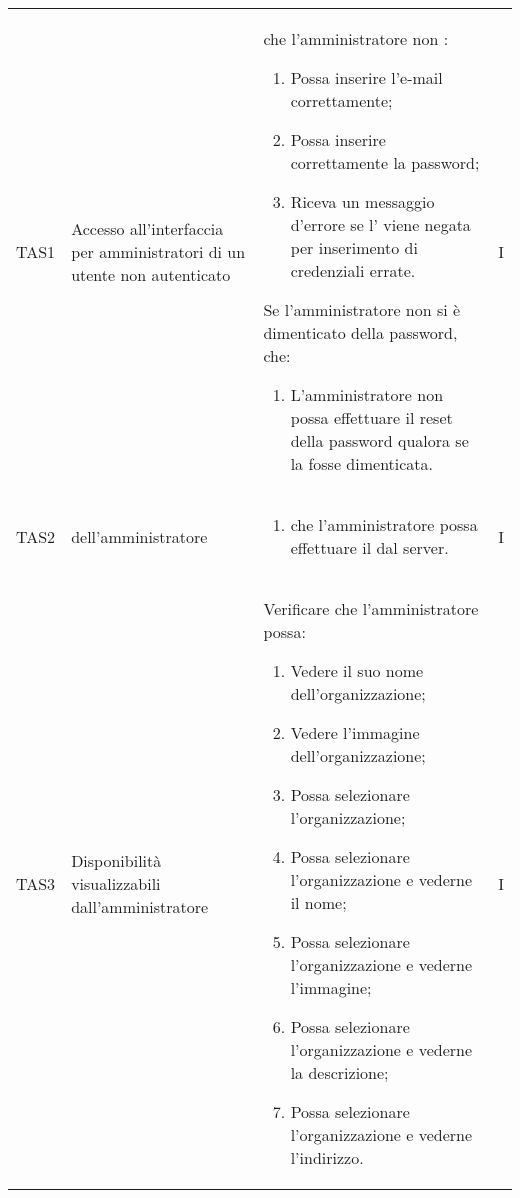 {\begin{longtable}{ c  C{2.5cm}  C{10cm} C{1cm}}
TAS1 & Accesso all'interfaccia per amministratori di un utente non autenticato & 
 che l'amministratore non :
\begin{enumerate}
    \item Possa inserire l'e-mail correttamente;
    \item Possa inserire correttamente la password;
    \item Riceva un messaggio d'errore se l' viene negata per inserimento di credenziali errate.
\end{enumerate}
Se l'amministratore non  si è dimenticato della password,  che:
\begin{enumerate}[resume]
    \item L'amministratore non  possa effettuare il reset della password qualora se la fosse dimenticata.
\end{enumerate} & I \\

TAS2 &  dell'amministratore  & \begin{enumerate}
    \item {} che l'amministratore  possa effettuare il  dal server.
\end{enumerate} & I \\

TAS3 & Disponibilità  visualizzabili dall'amministratore &
Verificare che l'amministratore possa:
\begin{enumerate}
    \item Vedere il suo nome dell'organizzazione;
    \item Vedere l'immagine dell'organizzazione;
    \item Possa selezionare l'organizzazione;
    \item Possa selezionare l'organizzazione e vederne il nome;
    \item Possa selezionare l'organizzazione e vederne l'immagine;
    \item Possa selezionare l'organizzazione e vederne la descrizione;
    \item Possa selezionare l'organizzazione e vederne l'indirizzo.
\end{enumerate} & I \\


\end{longtable}}
